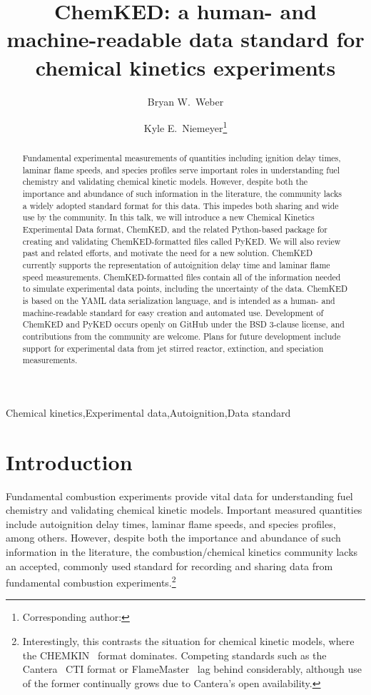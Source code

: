 \documentclass[12pt]{ijck}
\title{ ChemKED: a human- and machine-readable data standard for chemical kinetics experiments }
\author[1]{Bryan W.~Weber}
\author[2]{Kyle E.~Niemeyer\thanks{Corresponding author: \email{kyle.niemeyer@oregonstate.edu}}}
\affil[1]{Department of Mechanical Engineering, University of Connecticut, Storrs, CT, USA}
\affil[2]{School of Mechanical, Industrial, and Manufacturing Engineering, Oregon State University, Corvallis, OR, USA}
\begin{document}
\maketitle

\begin{keyword}
    Chemical kinetics\sep Experimental data\sep Autoignition\sep Data standard \\
\end{keyword}

\begin{abstract} %
Fundamental experimental measurements of quantities including ignition delay times,
laminar flame speeds, and species profiles serve important roles in understanding
fuel chemistry and validating chemical kinetic models. However, despite both the
importance and abundance of such information in the literature, the community lacks
a widely adopted standard format for this data. This impedes both sharing and wide
use by the community. In this talk, we will introduce a new Chemical Kinetics
Experimental Data format, ChemKED, and the related Python-based package for creating
and validating ChemKED-formatted files called PyKED. We will also review past and
related efforts, and motivate the need for a new solution. ChemKED currently supports
the representation of autoignition delay time and laminar flame speed measurements.
ChemKED-formatted files contain all of the information needed to simulate experimental
data points, including the uncertainty of the data. ChemKED is based on the YAML data
serialization language, and is intended as a human- and machine-readable standard for
easy creation and automated use.
Development of ChemKED and PyKED occurs openly on GitHub under the
BSD 3-clause license, and contributions from the community are welcome. Plans for
future development include support for experimental data from jet stirred reactor,
extinction, and speciation measurements.
\end{abstract}


\section{Introduction}
%
Fundamental combustion experiments provide vital data for understanding fuel
chemistry and validating chemical kinetic models. Important measured quantities
include autoignition delay times, laminar flame speeds, and species profiles,
among others. However, despite both the importance and abundance of such
information in the literature, the combustion\slash chemical kinetics community
lacks an accepted, commonly used standard for recording and sharing data from
fundamental combustion experiments.\footnote{Interestingly, this contrasts the
situation for chemical kinetic models, where the CHEMKIN~\autocite{Kee:1996ck}
format dominates. Competing standards such as the
Cantera~\autocite{Cantera:2.3.0} CTI format or
FlameMaster~\autocite{FlameMaster:ref} lag behind considerably,
although use of the former continually grows due to Cantera's open availability.
}
\end{document}
